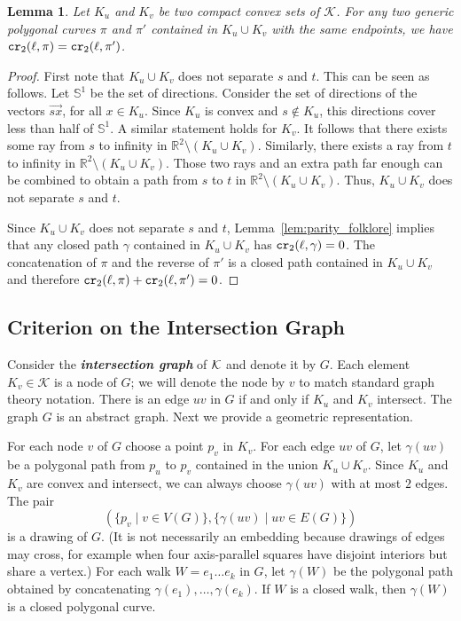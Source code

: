 \documentclass[a4paper,11pt]{article}
\newcommand{\RR}{\mathbb{R}}
\renewcommand{\SS}{\mathbb{S}}
\newcommand{\calK}{\mathcal{K}}
\newcommand\CR{\mbox{\tt cr}_2}
\def\DEF#1{\textbf{\emph{#1}}}
\newtheorem{lemma}[theorem]{Lemma}
\begin{document}
\begin{lemma}
\label{lem:same}
	Let $K_u$ and $K_v$ be two compact convex sets of $\calK$.
	For any two generic polygonal curves $\pi$ and $\pi'$ contained in $K_u\cup K_v$ 
	with the same endpoints, we have $\CR(\ell,\pi)=\CR(\ell,\pi')$.
\end{lemma}
\begin{proof}
	First note that $K_u\cup K_v$ does not separate $s$ and $t$. This can be 
	seen as follows. Let $\SS^1$ be the set of directions.
	Consider the set of directions of the vectors $\overrightarrow{sx}$,
	for all $x\in K_u$. Since $K_u$ is convex and $s\notin K_u$, this directions
	cover less than half of $\SS^1$. A similar statement holds for $K_v$.
	It follows that there exists some ray from $s$ to infinity
	in $\RR^2\setminus (K_u\cup K_v)$. Similarly, there exists a ray from $t$ to infinity
	in $\RR^2\setminus (K_u\cup K_v)$. Those two rays and an extra path far enough
	can be combined to obtain a path from $s$ to $t$ in $\RR^2\setminus (K_u\cup K_v)$. Thus,
	$K_u\cup K_v$ does not separate $s$ and $t$. 

	Since $K_u\cup K_v$ does not separate $s$ and $t$, 
	Lemma~\ref{lem:parity_folklore} implies that any closed path $\gamma$ contained
	in $K_u\cup K_v$ has $\CR(\ell,\gamma)=0$.
	The concatenation of $\pi$ and the reverse of $\pi'$ is a closed path contained
	in $K_u\cup K_v$ and therefore $\CR(\ell,\pi)+\CR(\ell,\pi')=0$.
\end{proof}

\subsection{Criterion on the Intersection Graph} 
\label{sec:intersection}

Consider the \DEF{intersection graph} of $\cal K$ and denote it by $G$.
Each element $K_v\in\calK$ is a node of $G$; we will denote the node by $v$ to 
match standard graph theory notation.
There is an edge $uv$ in $G$ if and only if $K_u$ and $K_v$ intersect. 
The graph $G$ is an abstract graph. 
Next we provide a geometric representation.

For each node $v$ of $G$ choose a point $p_v$ in $K_v$. 
For each edge $uv$ of $G$, let $\gamma(uv)$ be a polygonal path from $p_u$ to $p_v$
contained in the union $K_u\cup K_v$. Since $K_u$ and $K_v$ are convex and intersect, 
we can always choose $\gamma(uv)$ with at most $2$ edges.
The pair 
\[
	(\{ p_v\mid v\in V(G)\},\{ \gamma(uv)\mid uv\in E(G)\})
\] 
is a drawing of $G$.
(It is not necessarily an embedding because drawings of edges may cross, for example when four 
axis-parallel squares have disjoint interiors but share a vertex.)
For each walk $W=e_1\dots e_k$ in $G$, let $\gamma(W)$ be the polygonal path obtained
by concatenating $\gamma(e_1),\dots, \gamma(e_k)$. 
If $W$ is a closed walk, then $\gamma(W)$ is a closed polygonal curve.
\end{document}
